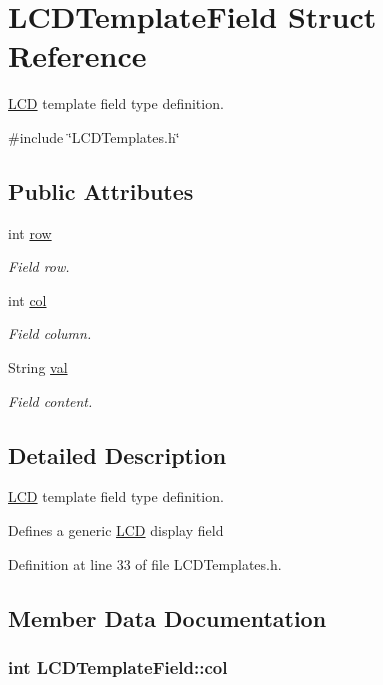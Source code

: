 \hypertarget{struct_l_c_d_template_field}{\section{L\-C\-D\-Template\-Field Struct Reference}
\label{struct_l_c_d_template_field}
}


\hyperlink{class_l_c_d}{L\-C\-D} template field type definition.  




{\ttfamily \#include \char`\"{}L\-C\-D\-Templates.\-h\char`\"{}}

\subsection*{Public Attributes}
\begin{DoxyCompactItemize}
\item 
int \hyperlink{struct_l_c_d_template_field_a842db0224937e139c4ff9f9a6da123e6}{row}
\begin{DoxyCompactList}\small\item\em Field row. \end{DoxyCompactList}\item 
int \hyperlink{struct_l_c_d_template_field_a5dec4293e8f4f297609c83e8612c3f06}{col}
\begin{DoxyCompactList}\small\item\em Field column. \end{DoxyCompactList}\item 
String \hyperlink{struct_l_c_d_template_field_a6eb7ce0547fc28ac3a2538f0fac3f117}{val}
\begin{DoxyCompactList}\small\item\em Field content. \end{DoxyCompactList}\end{DoxyCompactItemize}


\subsection{Detailed Description}
\hyperlink{class_l_c_d}{L\-C\-D} template field type definition. 

Defines a generic \hyperlink{class_l_c_d}{L\-C\-D} display field 

Definition at line 33 of file L\-C\-D\-Templates.\-h.



\subsection{Member Data Documentation}
\hypertarget{struct_l_c_d_template_field_a5dec4293e8f4f297609c83e8612c3f06}{
\subsubsection[{col}]{\setlength{\rightskip}{0pt plus 5cm}int L\-C\-D\-Template\-Field\-::col}}\label{struct_l_c_d_template_field_a5dec4293e8f4f297609c83e8612c3f06}



